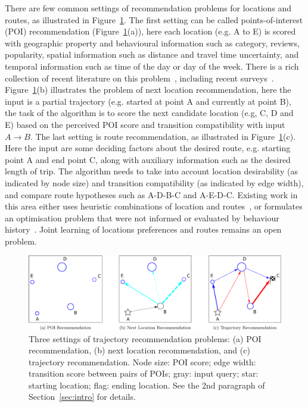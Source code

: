 There are few common settings of recommendation problems for locations and routes, as illustrated in Figure~\ref{fig:threesettings}. 
The first setting can be called points-of-interest (POI) recommendation (Figure~\ref{fig:threesettings}(a)), here each location (e.g. A to E) is scored with geographic property and behavioural information such as category, reviews, popularity, spatial information such as distance and travel time uncertainty, and temporal information such as time of the day or day of the week.  There is a rich collection of recent literature on this problem~\cite{bao2015recommendations,yin2015joint,shi2011personalized,lian2014geomf,liu2014exploiting,yuan2013timeaware,hsieh2014mining,gao2013temporal,yuan2014graph}, including recent surveys~\cite{bao2015recommendations,zheng2014urban}. 
Figure~\ref{fig:threesettings}(b) illustrates the problem of next location recommendation\cite{ijcai13,aaai16,baraglia2013learnext,zhang2015location}, here the input is a partial trajectory (e.g. started at point A and currently at point B), the task of the algorithm is to score the next candidate location (e.g, C, D and E) based on the perceived POI score and transition compatibility with input $A\rightarrow B$. 
    The last setting is route recommendation, as illustrated in Figure~\ref{fig:threesettings}(c). Here the input are some deciding factors about the desired route, e.g. starting point A and end point C, along with auxiliary information such as the desired length of trip. The algorithm needs to take into account location desirability (as indicated by node size) and transition compatibility (as indicated by edge width), and compare route hypotheses such as A-D-B-C and A-E-D-C. Existing work in this area either uses heuristic combinations of location and routes~\cite{ijcai15,lu2012personalized}, or formulates an optimisation problem that were not informed or evaluated by behaviour history~\cite{gioniswsdm14,chen2015tripplanner}. Joint learning of locations preferences and routes remains an open problem.

\begin{figure}[t]
	\centering
	\includegraphics[width=\textwidth]{fig/fig1-flavours.pdf}
	\caption{Three settings of trajectory recommendation problems: (a) POI recommendation, (b) next location recommendation, and (c) trajectory recommendation. Node size: POI score; edge width: transition score between pairs of POIs; gray: input query; star: starting location; flag: ending location. See the 2nd paragraph of Section~\ref{sec:intro} for details.
}
	\label{fig:threesettings}
\end{figure}

